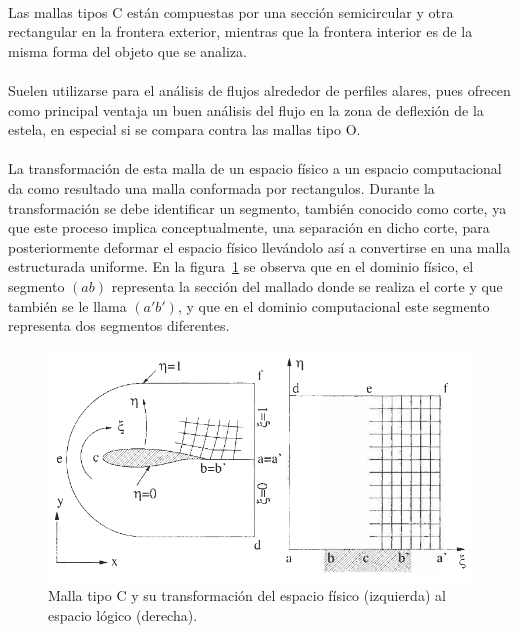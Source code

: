 \documentclass[letterpaper, openright, 12pt]{book}
\begin{document}
    \paragraph*{}
    Las mallas tipos C están compuestas por una sección semicircular y otra
    rectangular en la frontera exterior, mientras que la frontera interior
    es de la misma forma del objeto que se analiza.

    \paragraph*{}
    Suelen utilizarse para el análisis de flujos alrededor de perfiles
    alares, pues ofrecen como principal ventaja un buen análisis del flujo
    en la zona de deflexión de la estela, en especial si se compara contra
    las mallas tipo O.\cite{best-practices-grid-generation}

    \paragraph{}
    La transformación de esta malla de un espacio físico a un espacio
    computacional da como resultado una malla conformada por rectangulos.
    Durante la transformación se debe identificar un segmento, también
    conocido como corte, ya que este proceso implica conceptualmente, una
    separación en dicho corte, para posteriormente deformar el espacio
    físico llevándolo así a convertirse en una malla estructurada uniforme.
    En la figura~\ref{fig:malla-c} se observa que en el dominio físico, el
    segmento $(ab)$ representa la sección del mallado donde se realiza el
    corte y que también se le llama $(a'b')$, y que en el dominio
    computacional este segmento representa dos segmentos diferentes.
    \begin{figure}[htbp!]
        \centering
        \includegraphics[keepaspectratio, width=155mm]{./img/malla-c}
        \captionsetup{justification=centering, margin=2cm}
        \caption[Malla tipo C]{Malla tipo C y su transformación del espacio
            físico (izquierda) al espacio lógico (derecha).~\cite{blazek}}
        \label{fig:malla-c}
    \end{figure}
\end{document}
